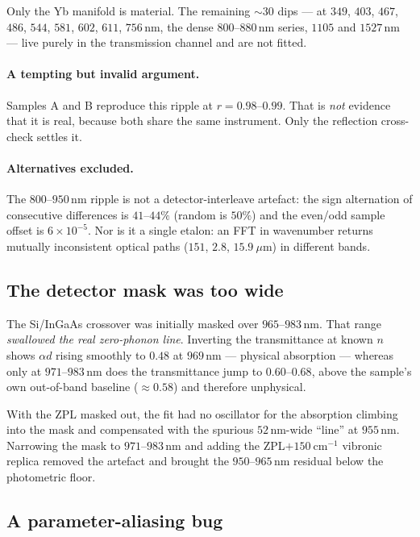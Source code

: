 \documentclass[11pt,a4paper]{article}
\newcommand{\ad}{\alpha d}
\begin{document}
Only the Yb manifold is material. The remaining $\sim30$ dips --- at $349$,
$403$, $467$, $486$, $544$, $581$, $602$, $611$, $756$\,nm, the dense
$800$--$880$\,nm series, $1105$ and $1527$\,nm --- live purely in the
transmission channel and are not fitted.

\paragraph{A tempting but invalid argument.} Samples A and B reproduce this
ripple at $r=0.98$--$0.99$. That is \emph{not} evidence that it is real, because
both share the same instrument. Only the reflection cross-check settles it.

\paragraph{Alternatives excluded.} The $800$--$950$\,nm ripple is not a
detector-interleave artefact: the sign alternation of consecutive differences is
$41$--$44\%$ (random is $50\%$) and the even/odd sample offset is
$6\times10^{-5}$. Nor is it a single etalon: an FFT in wavenumber returns
mutually inconsistent optical paths ($151$, $2.8$, $15.9\ \mu$m) in different
bands.

\subsection{The detector mask was too wide}

The Si/InGaAs crossover was initially masked over $965$--$983$\,nm. That range
\emph{swallowed the real zero-phonon line}. Inverting the transmittance at known
$n$ shows $\ad$ rising smoothly to $0.48$ at $969$\,nm --- physical absorption
--- whereas only at $971$--$983$\,nm does the transmittance jump to
$0.60$--$0.68$, above the sample's own out-of-band baseline ($\approx0.58$) and
therefore unphysical.

With the ZPL masked out, the fit had no oscillator for the absorption climbing
into the mask and compensated with the spurious $52$\,nm-wide ``line'' at
$955$\,nm. Narrowing the mask to $971$--$983$\,nm and adding the ZPL$+150\
\mathrm{cm}^{-1}$ vibronic replica removed the artefact and brought the
$950$--$965$\,nm residual below the photometric floor.

\subsection{A parameter-aliasing bug}
\end{document}
